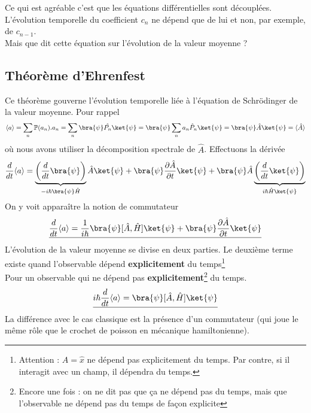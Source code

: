 Ce qui est agréable c'est que les équations différentielles sont découplées.  L'évolution 
temporelle du coefficient $c_n$ ne dépend que de lui et non, par exemple, de $c_{n-1}$.\\

Mais que dit cette équation sur l'évolution de la valeur moyenne ?

	\subsection{Théorème d'Ehrenfest}
	Ce théorème gouverne l'évolution temporelle liée à l'équation de Schrödinger de la 
	valeur moyenne. Pour rappel
	\begin{equation}
	\langle a \rangle = \sum_n \mathbb{P}(a_n).a_n = \sum_n \bra{\psi}\hat{P_n}\ket{\psi} 
	= \bra{\psi}\sum_n a_n \hat P_n \ket{\psi} = \bra{\psi}\hat{A}\ket{\psi} = \langle\hat{A}
	\rangle
	\end{equation}
	où nous avons utiliser la décomposition spectrale de $\hat{A}$. Effectuons la dérivée
	\begin{equation}
	\dfrac{d}{dt}\langle a\rangle = \underbrace{\left(\dfrac{d}{dt}\bra{\psi}\right)}_{-i\hbar 
	\bra{\psi}\hat{H}}\hat{A}\ket{\psi} + \bra{\psi}\dfrac{\partial \hat{A}}{\partial t}\ket{\psi} +
	\bra{\psi}\hat{A}\underbrace{\left(\dfrac{d}{dt}\ket{\psi}\right)}_{i\hbar \hat{H}\ket{\psi}}
	\end{equation}
	On y voit apparaître la notion de commutateur
	\begin{equation}
	\underline{\dfrac{d}{dt}\langle a\rangle = \dfrac{1}{i\hbar}\bra{\psi}[\hat{A},\hat{H}]\ket{\psi} + 
	\bra{\psi}\dfrac{\partial\hat{A}}{\partial t}\ket{\psi}}
	\end{equation}
	L'évolution de la valeur moyenne se divise en deux parties. Le deuxième terme existe quand 
	l'observable dépend \textbf{explicitement} du temps\footnote{Attention : $\hat{A} = \hat{x}$ ne 
	dépend pas explicitement du temps. Par contre, si il interagit avec un champ, il dépendra du 
	temps.} \\
	
	Pour un observable qui ne dépend pas \textbf{explicitement}\footnote{Encore une fois : on ne 
	dit pas que ça ne dépend pas du temps, mais que l'observable ne dépend pas du temps de façon 
	explicite} du temps.
	\begin{equation}
	\underline{i\hbar \dfrac{d}{dt}\langle a\rangle = \bra{\psi}[\hat{A},\hat{H}]\ket{\psi}}
	\end{equation}
	La différence avec le cas classique est la présence d'un commutateur (qui joue le même rôle 
	que le crochet de poisson en mécanique hamiltonienne).\\
	
